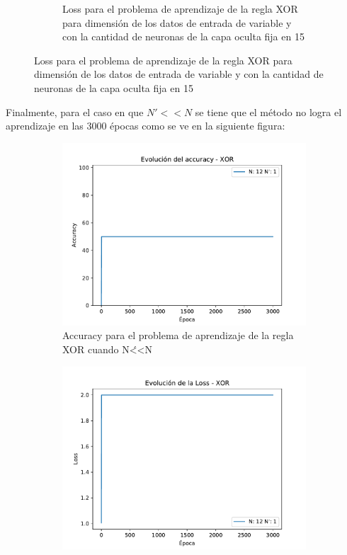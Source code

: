 \begin{figure}[H]
\begin{subfigure}[b]{0.45\textwidth}
         \caption{Loss para el problema de aprendizaje de la regla XOR  para dimensión de los datos de entrada de variable y con la cantidad de neuronas de la capa oculta fija en 15}
         \label{fig:loss6a}
     \end{subfigure}
\end{figure}

Finalmente, para el caso en que $N' << N$ se tiene que el método no logra el aprendizaje en las 3000 épocas como se ve en la siguiente figura:

\begin{figure}[H]
     \centering
     \begin{subfigure}[b]{0.45\textwidth}
         \centering
         \includegraphics[width=\textwidth]{image/NvsNp_acc3.pdf}
         \caption{Accuracy para el problema de aprendizaje de la regla XOR cuando N\'<<N}
         \label{fig:acc6a}
     \end{subfigure}
     \hfill
     \begin{subfigure}[b]{0.45\textwidth}
         \centering
         \includegraphics[width=\textwidth]{image/NvsNp_loss3.pdf}

\end{subfigure}
\end{figure}

